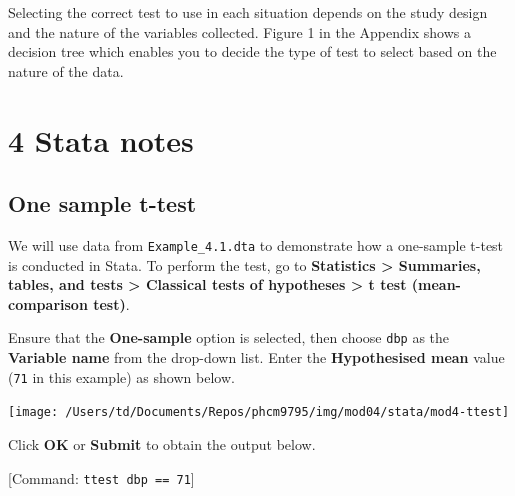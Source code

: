 \documentclass[
]{memoir}
\begin{document}
Selecting the correct test to use in each situation depends on the study design and the nature of the variables collected. Figure 1 in the Appendix shows a decision tree which enables you to decide the type of test to select based on the nature of the data.

\hypertarget{stata-notes-2}{%
\chapter*{\texorpdfstring{\textbf{4} Stata notes}{4 Stata notes}}\label{stata-notes-2}}

\hypertarget{one-sample-t-test-1}{%
\section{One sample t-test}\label{one-sample-t-test-1}}

We will use data from \texttt{Example\_4.1.dta} to demonstrate how a one-sample t-test is conducted in Stata. To perform the test, go to \textbf{Statistics \textgreater{} Summaries, tables, and tests \textgreater{} Classical tests of hypotheses \textgreater{} t test (mean-comparison test)}.

Ensure that the \textbf{One-sample} option is selected, then choose \texttt{dbp} as the \textbf{Variable name} from the drop-down list. Enter the \textbf{Hypothesised mean} value (\texttt{71} in this example) as shown below.

\texttt{[image: /Users/td/Documents/Repos/phcm9795/img/mod04/stata/mod4-ttest]}

Click \textbf{OK} or \textbf{Submit} to obtain the output below.

{[}Command: \texttt{ttest\ dbp\ ==\ 71}{]}
\end{document}
